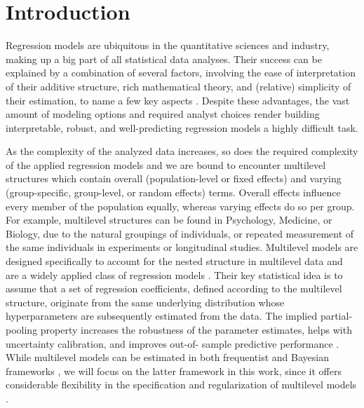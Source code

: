 \section{Introduction}
Regression models are ubiquitous in the quantitative sciences and industry, making up a big part of all statistical data analyses. Their success can be explained by a combination of several factors, involving the ease of interpretation of their additive structure, rich mathematical theory, and (relative) simplicity of their estimation, to name a few key aspects \citep{gelmanregstories2020, harrell2013regression}. Despite these advantages, the vast amount of modeling options and required analyst choices render building interpretable, robust, and well-predicting regression models a highly difficult task.

As the complexity of the analyzed data increases, so does the required complexity of the applied regression models and we are bound to encounter multilevel structures which contain overall (population-level or fixed effects) and varying (group-specific, group-level, or random effects) terms. 	Overall effects influence every member of the population equally, whereas varying effects do so per group. For example, multilevel structures can be found in Psychology, Medicine, or Biology, due to the natural groupings of individuals, or repeated measurement of the same individuals in experiments or longitudinal studies. Multilevel models are designed specifically to account for the nested structure in multilevel data and are a widely applied class of regression models \citep{lme4, gelman_hill_2006, brmsJSSitems}. Their key statistical idea is to assume that a set of regression coefficients, defined according to the multilevel structure, originate from the same underlying distribution whose hyperparameters are subsequently estimated from the data. The implied partial-pooling property  increases the robustness of the parameter estimates, helps with uncertainty calibration, and improves out-of- sample predictive performance \citep{gelman2013bda, gelman_hill_2006}. While multilevel models can be estimated in both frequentist and Bayesian frameworks \citep{lme4, brmsJSS}, we will focus on the latter framework in this work, since it offers considerable flexibility in the specification and regularization of multilevel models \citep{gelman2013bda}.

